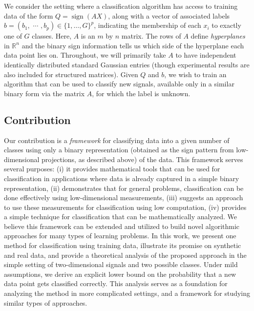 \documentclass[twoside,11pt]{article}
\def \R {\mathbb{R}}
\DeclareMathOperator*{\sign}{sign}
\newcommand{\edit}[1]{{{#1}}}
\begin{document}
We consider the setting where a classification algorithm has access to training data of the form $Q=\sign(AX)$,  along with a vector of associated labels 
  $b = (b_1, \,\, \cdots \,\, , b_p )\in\{1,\dots,G\}^p$, indicating the membership of each $x_i$ to exactly one of $G$ classes. Here, $A$ is an $m$ by $n$ matrix. The rows of $A$ define \textit{hyperplanes} in $\R^n$ and the binary sign information tells us which side of the hyperplane each data point lies on. Throughout, we will \edit{primarily} take $A$ to have independent identically distributed standard Gaussian entries \edit{(though experimental results are also included for structured matrices)}. 
Given $Q$ and $b$,
 we wish to train an algorithm that can be used to classify new signals, available only in a similar binary form via the matrix $A$, for which the label is unknown. 
 
 \subsection{Contribution} 
Our contribution is a \textit{framework} for classifying data into a given number of classes using only a binary representation \edit{(obtained as the sign pattern from low-dimensional projections, as described above)} of the data. This framework serves several purposes: (i) it provides mathematical tools that can be used for classification in applications where data is already captured in a simple binary representation, (ii) demonstrates that for general problems, classification can be done effectively using 
low-dimensional measurements, (iii) suggests an approach to use these measurements for classification using 
low computation, (iv) provides a simple technique for classification that can be mathematically analyzed.  We believe this framework can be extended and utilized to build novel algorithmic approaches for many types of learning problems. In this work, we present one method for classification using training data, illustrate its promise on synthetic and real data, and provide a theoretical analysis of the proposed approach in the simple setting of two-dimensional signals and two possible classes. Under mild assumptions, we derive an explicit lower bound on the probability that a new data point gets classified correctly. This analysis serves as a foundation for analyzing the method in more complicated settings, and a framework for studying similar types of approaches.
\end{document}
